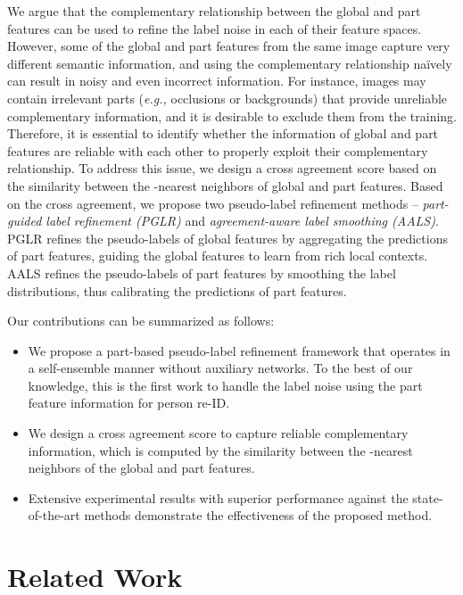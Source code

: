 \documentclass[10pt,twocolumn,letterpaper]{article}
\begin{document}
    We argue that the complementary relationship between the global and part features can be used to refine the label noise in each of their feature spaces.
    However, some of the global and part features from the same image capture very different semantic information, and using the complementary relationship na\"ively can result in noisy and even incorrect information.
    For instance, images may contain irrelevant parts (\textit{e.g.,} occlusions or backgrounds) that provide unreliable complementary information, and it is desirable to exclude them from the training.
    Therefore, it is essential to identify whether the information of global and part features are reliable with each other to properly exploit their complementary relationship.
    To address this issue, we design a cross agreement score based on the similarity between the -nearest neighbors of global and part features.
    Based on the cross agreement, we propose two pseudo-label refinement methods -- \textit{part-guided label refinement (PGLR)} and \textit{agreement-aware label smoothing (AALS)}.
    PGLR refines the pseudo-labels of global features by aggregating the predictions of part features, guiding the global features to learn from rich local contexts.
    AALS refines the pseudo-labels of part features by smoothing the label distributions, thus calibrating the predictions of part features.
    
    Our contributions can be summarized as follows:
    \begin{itemize}
    \vspace{-2.5mm}
    \item We propose a part-based pseudo-label refinement framework that operates in a self-ensemble manner without auxiliary networks.
          To the best of our knowledge, this is the first work to handle the label noise using the part feature information for person re-ID.
    \vspace{-2.5mm}
    \item We design a cross agreement score to capture reliable complementary information, which is computed by the similarity between the -nearest neighbors of the global and part features.
    \vspace{-2.5mm}
    \item Extensive experimental results with superior performance against the state-of-the-art methods demonstrate the effectiveness of the proposed method.
    \end{itemize}
 \section{Related Work} \label{sec:2}
\end{document}
